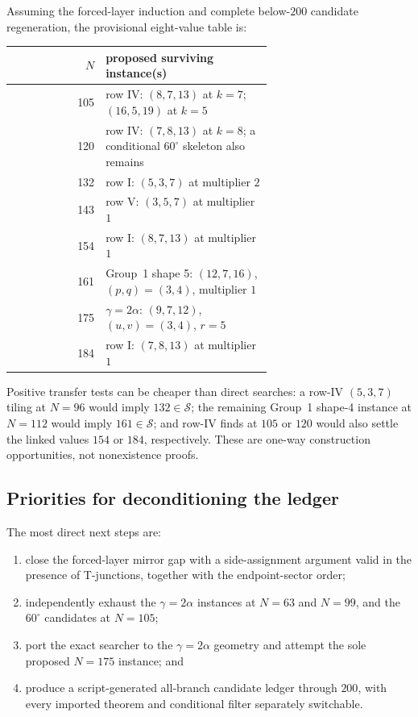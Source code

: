 \documentclass[11pt]{amsart}
\theoremstyle{definition}
\theoremstyle{remark}
\newcommand{\Sset}{\mathcal S}
\begin{document}
Assuming the forced-layer induction and complete below-$200$ candidate
regeneration, the provisional eight-value table is:
\begin{center}
\small
\renewcommand{\arraystretch}{1.12}
\begin{tabular}{@{}r>{\raggedright\arraybackslash}p{0.64\linewidth}@{}}
\toprule
$N$ & proposed surviving instance(s) \\
\midrule
105 & row IV: $(8,7,13)$ at $k=7$; $(16,5,19)$ at $k=5$ \\
120 & row IV: $(7,8,13)$ at $k=8$; a conditional $60^\circ$ skeleton also remains \\
132 & row I: $(5,3,7)$ at multiplier $2$ \\
143 & row V: $(3,5,7)$ at multiplier $1$ \\
154 & row I: $(8,7,13)$ at multiplier $1$ \\
161 & Group~1 shape 5: $(12,7,16)$, $(p,q)=(3,4)$, multiplier $1$ \\
175 & $\gamma=2\alpha$: $(9,7,12)$, $(u,v)=(3,4)$, $r=5$ \\
184 & row I: $(7,8,13)$ at multiplier $1$ \\
\bottomrule
\end{tabular}
\end{center}
Positive transfer tests can be cheaper than direct searches: a row-IV
$(5,3,7)$ tiling at $N=96$ would imply $132\in\Sset$; the remaining Group~1
shape-4 instance at $N=112$ would imply $161\in\Sset$; and row-IV finds at
$105$ or $120$ would also settle the linked values $154$ or $184$,
respectively.  These are one-way construction opportunities, not
nonexistence proofs.

\subsection{Priorities for deconditioning the ledger}

The most direct next steps are:
\begin{enumerate}[leftmargin=2.2em]
\item close the forced-layer mirror gap with a side-assignment argument valid
      in the presence of T-junctions, together with the endpoint-sector order;
\item independently exhaust the $\gamma=2\alpha$ instances at $N=63$ and
      $N=99$, and the $60^\circ$ candidates at $N=105$;
\item port the exact searcher to the $\gamma=2\alpha$ geometry and attempt
      the sole proposed $N=175$ instance; and
\item produce a script-generated all-branch candidate ledger through $200$,
      with every imported theorem and conditional filter separately
      switchable.
\end{enumerate}
\end{document}
